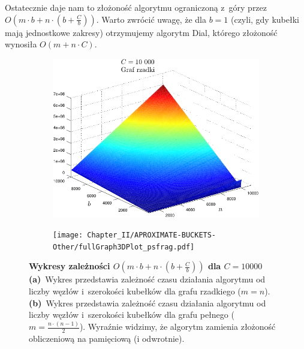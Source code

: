 Ostatecznie daje nam to złożoność algorytmu ograniczoną z~góry przez $O \left( m \cdot b + n \cdot \left( b + \frac{C}{b}\right)\right)$.
Warto zwrócić uwagę, że dla $b=1$ (czyli, gdy kubełki mają jednostkowe zakresy) otrzymujemy algorytm Dial, którego złożoność wynosiła $O \left( m + n \cdot C \right)$.

\begin{figure}[!htbp]
	\centering
	\null\hfill
	\begin{subfigure}[b]{0.48\textwidth}
		\includegraphics[width=\textwidth]{Chapter_II/APROXIMATE-BUCKETS-Other/sparseGraphPlot3D_psfrag.pdf}
		\caption{}
		\label{fig:plotAproximateBucketsComplexity:a}
	\end{subfigure}
	\hfill
	\begin{subfigure}[b]{0.48\textwidth}
		\texttt{[image: Chapter\_II/APROXIMATE-BUCKETS-Other/fullGraph3DPlot\_psfrag.pdf]}
		\caption{}
		\label{fig:plotAproximateBucketsComplexity:b}
	\end{subfigure}
	\hfill\null
	\caption{
		\textbf{Wykresy zależności $ O \left( m \cdot b + n \cdot \left( b + \frac{C}{b} \right) \right) $ dla $C = 10000$}
		\textbf{(a)}~Wykres przedstawia zależność czasu działania algorytmu od liczby węzłów i~szerokości kubełków dla grafu rzadkiego ($ m = n $).
		\textbf{(b)}~Wykres przedstawia zależność czasu działania algorytmu od liczby węzłów i~szerokości kubełków dla grafu pełnego ($ m = \frac{n \cdot \left( n - 1\right)}{2}$).
		Wyraźnie widzimy, że algorytm zamienia złożoność obliczeniową na pamięciową (i odwrotnie).
	}
	\label{fig:plotAproximateBucketsComplexity}
\end{figure}

